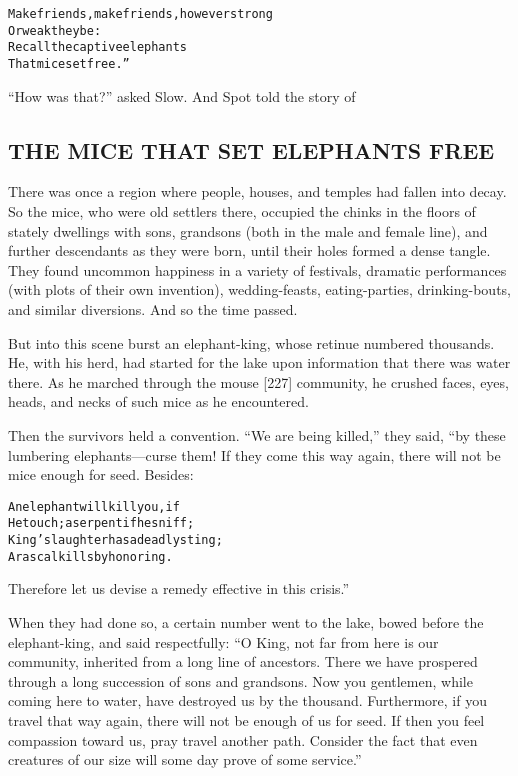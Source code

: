 \documentclass{article}
\renewenvironment{verbatim}{\begin{alltt}\normalfont\begin{centering}}{\end{centering}\end{alltt}}
\begin{document}
\begin{verbatim}
Make friends, make friends, however strong
    Or weak they be:
Recall the captive elephants
    That mice set free.”
\end{verbatim}
``How was that?'' asked Slow. And Spot told the story of

\subsection{THE MICE THAT SET ELEPHANTS FREE}

There was once a region where people, houses, and temples had
fallen into decay. So the mice, who were old settlers there,
occupied the chinks in the floors of stately dwellings with sons,
grandsons (both in the male and female line), and further
descendants as they were born, until their holes formed a dense
tangle. They found uncommon happiness in a variety of festivals,
dramatic performances (with plots of their own invention),
wedding-feasts, eating-parties, drinking-bouts, and similar
diversions. And so the time passed.

But into this scene burst an elephant-king, whose retinue numbered
thousands. He, with his herd, had started for the lake upon
information that there was water there. As he marched through the
mouse [227] community, he crushed faces, eyes, heads, and necks of
such mice as he encountered.

Then the survivors held a convention. ``We are being killed,'' they
said, “by these lumbering elephants---curse them! If they come this
way again, there will not be mice enough for seed. Besides:

\begin{verbatim}
An elephant will kill you, if
He touch; a serpent if he sniff;
King's laughter has a deadly sting;
A rascal kills by honoring.
\end{verbatim}
Therefore let us devise a remedy effective in this crisis.”

When they had done so, a certain number went to the lake, bowed
before the elephant-king, and said respectfully:
``O King, not far from here is our community, inherited from a long line of ancestors. There we have prospered through a long succession of sons and grandsons. Now you gentlemen, while coming here to water, have destroyed us by the thousand. Furthermore, if you travel that way again, there will not be enough of us for seed. If then you feel compassion toward us, pray travel another path. Consider the fact that even creatures of our size will some day prove of some service.''
\end{document}
